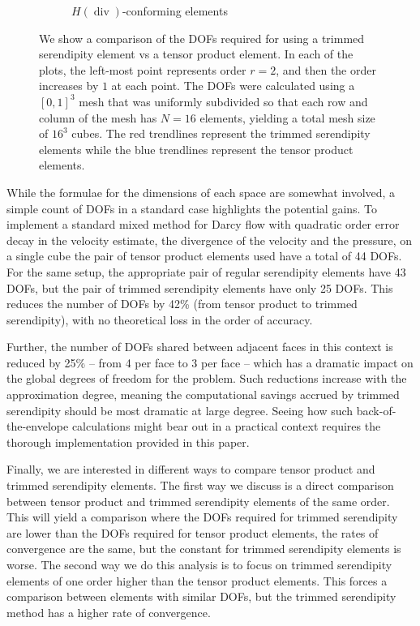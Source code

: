 \documentclass[format=acmsmall,screen,timestamp=false,a4paper]{acmart}
\DeclareMathOperator{\Div}{div}
\newcommand{\hdiv}{\ensuremath{{H}(\Div)}\xspace}
\begin{document}
\begin{figure}[htbp]
\begin{subfigure}[h]{0.3\textwidth}
      \caption{\hdiv-conforming elements\label{fig:2dProjectionH}}
    \end{subfigure}
  \caption{We show a comparison of the DOFs required for using a trimmed serendipity element vs a tensor product element.  In each of the plots, the left-most point represents order $r=2$, and then the order increases by $1$ at each point.  The DOFs were calculated using a $[0,1]^3$ mesh that was uniformly subdivided so that each row and column of the mesh has $N=16$ elements, yielding a total mesh size of $16^3$ cubes.  The red trendlines represent the trimmed serendipity elements while the blue trendlines represent the tensor product elements.\label{fig:DegsDofs}} 
\end{figure}
   
   
   
   While the formulae for the dimensions of each space are somewhat involved, a simple count of DOFs in a standard case highlights the potential gains.
   To implement a standard mixed method for Darcy flow with quadratic order error decay in the velocity estimate, the divergence of the velocity and the pressure, on a single cube the pair of tensor product elements used have a total of 44 DOFs.
   For the same setup, the appropriate pair of regular serendipity elements have 43 DOFs, but the pair of trimmed serendipity elements have only 25 DOFs. 
   This reduces the number of DOFs by 42\% (from tensor product to trimmed serendipity), with no theoretical loss in the order of accuracy.
   
   Further, the number of DOFs shared between adjacent faces in this context is reduced by 25\% -- from 4 per face to 3 per face -- which has a dramatic impact on the global degrees of freedom for the problem.
   Such reductions increase with the approximation degree, meaning the computational savings accrued by trimmed serendipity should be most dramatic at large degree.  
   Seeing how such back-of-the-envelope calculations might bear out in a practical context requires the thorough implementation provided in this paper.
   
  Finally, we are interested in different ways to compare tensor product and trimmed serendipity elements.  The first way we discuss is a direct comparison between tensor product and trimmed serendipity elements of the same order.  This will yield a comparison where the DOFs required for trimmed serendipity are lower than the DOFs required for tensor product elements, the rates of convergence are the same, but the constant for trimmed serendipity elements is worse.  The second way we do this analysis is to focus on trimmed serendipity elements of one order higher than the tensor product elements.  This forces a comparison between elements with similar DOFs, but the trimmed serendipity method has a higher rate of convergence.
\end{document}
